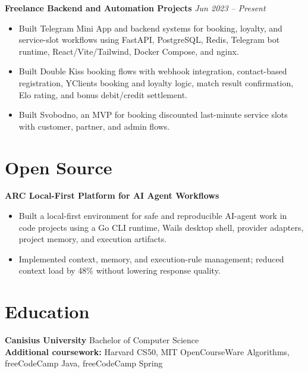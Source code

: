 \documentclass[10pt,a4paper]{article}
\begin{document}
\textbf{Freelance Backend and Automation Projects} \hfill \textit{Jun 2023 -- Present}
\begin{itemize}
  \item Built Telegram Mini App and backend systems for booking, loyalty, and service-slot workflows using FastAPI, PostgreSQL, Redis, Telegram bot runtime, React/Vite/Tailwind, Docker Compose, and nginx.
  \item Built Double Kiss booking flows with webhook integration, contact-based registration, YClients booking and loyalty logic, match result confirmation, Elo rating, and bonus debit/credit settlement.
  \item Built Svobodno, an MVP for booking discounted last-minute service slots with customer, partner, and admin flows.
\end{itemize}

\section*{Open Source}
\textbf{ARC \textbar{} Local-First Platform for AI Agent Workflows}
\begin{itemize}
  \item Built a local-first environment for safe and reproducible AI-agent work in code projects using a Go CLI runtime, Wails desktop shell, provider adapters, project memory, and execution artifacts.
  \item Implemented context, memory, and execution-rule management; reduced context load by 48\% without lowering response quality.
\end{itemize}

\section*{Education}
\textbf{Canisius University} \textbar{} Bachelor of Computer Science\\
\textbf{Additional coursework:} Harvard CS50, MIT OpenCourseWare Algorithms, freeCodeCamp Java, freeCodeCamp Spring
\end{document}
